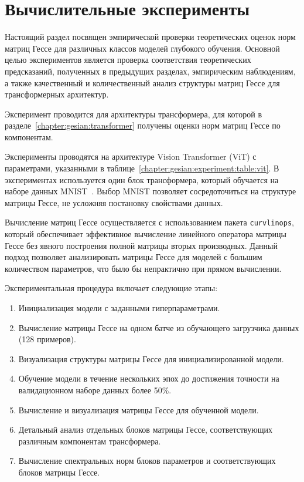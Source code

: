 \section{Вычислительные эксперименты}

Настоящий раздел посвящен эмпирической проверки теоретических оценок норм матриц Гессе для различных классов моделей глубокого обучения. Основной целью экспериментов является проверка соответствия теоретических предсказаний, полученных в предыдущих разделах, эмпирическим наблюдениям, а также качественный и количественный анализ структуры матриц Гессе для трансформерных архитектур.

Эксперимент проводится для архитектуры трансформера, для которой в разделе~\ref{chapter:gesian:transformer} получены оценки норм матриц Гессе по компонентам.

Эксперименты проводятся на архитектуре Vision Transformer (ViT) с параметрами, указанными в таблице~\ref{chapter:gesian:experiment:table:vit}. В экспериментах используется один блок трансформера, который обучается на наборе данных MNIST~\cite{deng2012mnist}. Выбор MNIST позволяет сосредоточиться на структуре матрицы Гессе, не усложняя постановку свойствами данных.

Вычисление матриц Гессе осуществляется с использованием пакета \texttt{curvlinops}, который обеспечивает эффективное вычисление линейного оператора матрицы Гессе без явного построения полной матрицы вторых производных. Данный подход позволяет анализировать матрицы Гессе для моделей с большим количеством параметров, что было бы непрактично при прямом вычислении.

Экспериментальная процедура включает следующие этапы:
\begin{enumerate}
    \item Инициализация модели с заданными гиперпараметрами.
    \item Вычисление матрицы Гессе на одном батче из обучающего загрузчика данных (128 примеров).
    \item Визуализация структуры матрицы Гессе для инициализированной модели.
    \item Обучение модели в течение нескольких эпох до достижения точности на валидационном наборе данных более 50\%.
    \item Вычисление и визуализация матрицы Гессе для обученной модели.
    \item Детальный анализ отдельных блоков матрицы Гессе, соответствующих различным компонентам трансформера.
    \item Вычисление спектральных норм блоков параметров и соответствующих блоков матрицы Гессе.
\end{enumerate}

